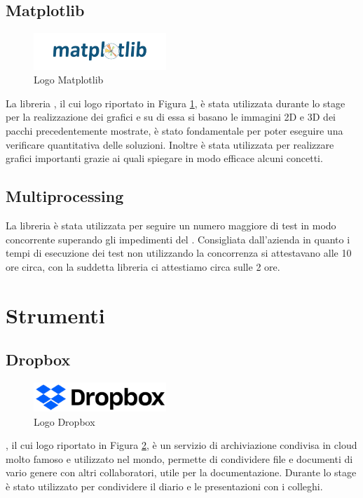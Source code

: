\subsection{Matplotlib}
\begin{figure}[H]
	\begin{center} \includegraphics[width=5cm]{figures/matplotlib-1}
		\caption[Logo Matplotlib]{Logo Matplotlib}
		\label{logo_matplotlib} 
	\end{center}
\end{figure}
La libreria , il cui logo riportato in Figura \ref{logo_matplotlib}, è stata utilizzata durante lo stage per la realizzazione dei grafici e su di essa si basano le immagini 2D e 3D dei pacchi precedentemente mostrate, è stato fondamentale per poter eseguire una verificare quantitativa delle soluzioni. Inoltre è stata utilizzata per realizzare grafici importanti grazie ai quali spiegare in modo efficace alcuni concetti.

\subsection{Multiprocessing}
La libreria  è stata utilizzata per seguire un numero maggiore di test in modo concorrente superando gli impedimenti del . Consigliata dall'azienda in quanto i tempi di esecuzione dei test non utilizzando la concorrenza si attestavano alle 10 ore circa, con la suddetta libreria ci attestiamo circa sulle 2 ore.

\section{Strumenti}
\subsection{Dropbox}
\begin{figure}[H]
	\begin{center} \includegraphics[width=5cm]{figures/dropbox_2017_logo}
		\caption[Logo Dropbox]{Logo Dropbox}  
		\label{logo_dropbox} 
	\end{center}
\end{figure}
, il cui logo riportato in Figura \ref{logo_dropbox}, è un servizio di archiviazione condivisa in cloud molto famoso e utilizzato nel mondo, permette di condividere file e documenti di vario genere con altri collaboratori, utile per la documentazione. Durante lo stage è stato utilizzato per condividere il diario e le presentazioni con i colleghi.

